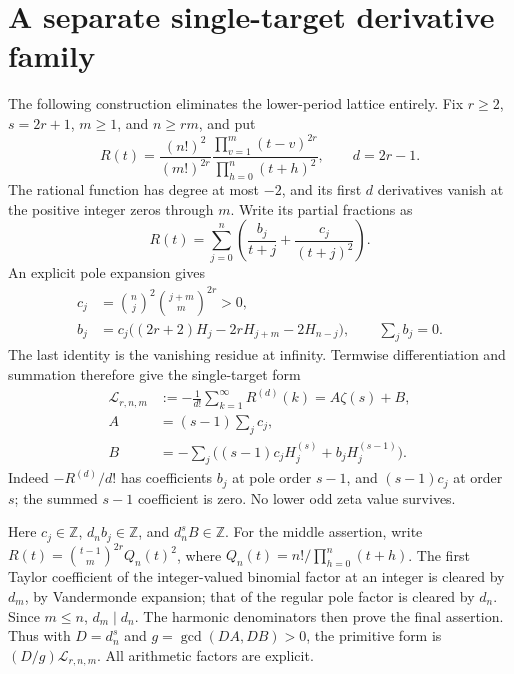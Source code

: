 \documentclass[11pt]{article}
\theoremstyle{remark}
\newcommand{\Z}{\mathbb Z}
\begin{document}
\section{A separate single-target derivative family}
The following construction eliminates the lower-period lattice entirely.
Fix \(r\ge2\), \(s=2r+1\), \(m\ge1\), and \(n\ge rm\), and put
\[
 R(t)=\frac{(n!)^2}{(m!)^{2r}}
       \frac{\prod_{v=1}^m(t-v)^{2r}}{\prod_{h=0}^n(t+h)^2},
 \qquad d=2r-1.
\]
The rational function has degree at most \(-2\), and its first \(d\)
derivatives vanish at the positive integer zeros through \(m\).
Write its partial fractions as
\[
 R(t)=\sum_{j=0}^n\left(\frac{b_j}{t+j}+\frac{c_j}{(t+j)^2}\right).
\]
An explicit pole expansion gives
\begin{align*}
 c_j&=\binom nj^2\binom{j+m}m^{2r}>0,\\
 b_j&=c_j\bigl((2r+2)H_j-2rH_{j+m}-2H_{n-j}\bigr),
 \qquad\sum_jb_j=0.
\end{align*}
The last identity is the vanishing residue at infinity. Termwise
differentiation and summation therefore give the single-target form
\begin{align*}
 \mathcal L_{r,n,m}
 &:=-\frac1{d!}\sum_{k=1}^{\infty}R^{(d)}(k)=A\zeta(s)+B,\\
 A&=(s-1)\sum_jc_j,\\
 B&=-\sum_j\bigl((s-1)c_jH_j^{(s)}+b_jH_j^{(s-1)}\bigr).
\end{align*}
Indeed \(-R^{(d)}/d!\) has coefficients \(b_j\) at pole order
\(s-1\), and \((s-1)c_j\) at order \(s\); the summed \(s-1\)
coefficient is zero. No lower odd zeta value survives.

Here \(c_j\in\Z\), \(d_nb_j\in\Z\), and \(d_n^sB\in\Z\).
For the middle assertion, write
\(R(t)=\binom{t-1}m^{2r}Q_n(t)^2\), where
\(Q_n(t)=n!/\prod_{h=0}^n(t+h)\). The first Taylor coefficient
of the integer-valued binomial factor at an integer is cleared by
\(d_m\), by Vandermonde expansion; that of the regular pole factor
is cleared by \(d_n\). Since \(m\le n\), \(d_m\mid d_n\).
The harmonic denominators then prove the final assertion. Thus with
\(D=d_n^s\) and \(g=\gcd(DA,DB)>0\), the primitive form is
\((D/g)\mathcal L_{r,n,m}\). All arithmetic factors are explicit.
\end{document}
